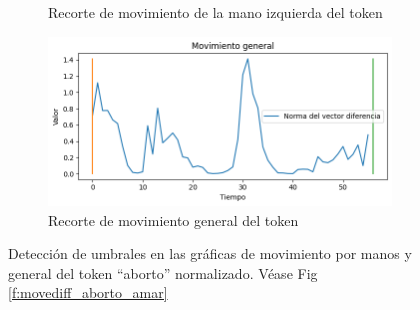 \begin{figure}[t]
\begin{subfigure}[t]{0.3\textwidth}
		\caption{Recorte de movimiento de la mano izquierda del token  }
		\label{f:lhand_movediff_aborto}
	\end{subfigure}
	\begin{subfigure}[t]{0.3\textwidth}
	\centering
		\includegraphics[align=t,width=0.9\linewidth, height=0.9\linewidth]{Graphics/recorte_general_aborto.png}
		\caption{Recorte de movimiento general del token  }
		\label{f:general_movediff_aborto}
	\end{subfigure}
	\caption{Detección de umbrales en las gráficas de movimiento por manos y general del token ``aborto'' normalizado. Véase Fig \ref{f:movediff_aborto_amar}}
	\label{f:recorte_aborto}
\end{figure}

